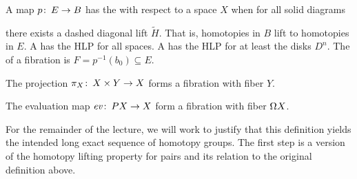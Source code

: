 \begin{definition}
A map $p\colon\thinspace E \to B$
has the  with respect to a space $X$ when for all solid diagrams
\begin{center}
\end{center}
there exists a dashed diagonal lift $\widetilde H$.
That is, homotopies in $B$ lift to homotopies in $E$.
A  has the HLP for all spaces.
A  has the HLP for at least the disks $D^n$.
The  of a fibration is $F = p^{-1}(b_0) \subseteq E$.
\end{definition}

\begin{example}
The projection $\pi_X\colon\thinspace X \times Y \to X$ forms a fibration with fiber $Y$.
\end{example}

\begin{example}
The evaluation map $\mathit{ev}\colon\thinspace PX \to X$ form a fibration with fiber $\Omega X$.
\end{example}

For the remainder of the lecture, we will work to justify that this definition yields the intended long exact sequence of homotopy groups.
The first step is a version of the homotopy lifting property for pairs and its relation to the original definition above.

